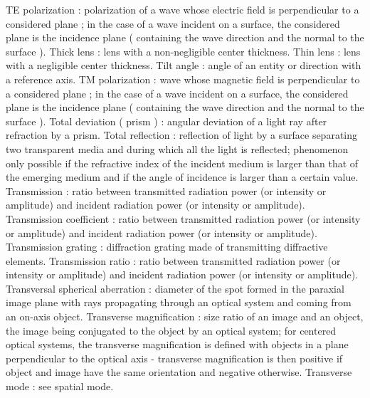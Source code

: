 TE polarization                                      : polarization of a wave whose electric field is perpendicular to a considered plane ; in the case of a wave incident on a surface, the considered plane is the incidence plane ( containing the wave direction and the normal to the surface ).
Thick lens                                           : lens with a non-negligible center thickness.
Thin lens                                            : lens with a negligible center thickness.
Tilt angle                                           : angle of an entity or direction with a reference axis.
TM polarization                                      : wave whose magnetic field is perpendicular to a considered plane ; in the case of a wave incident on a surface, the considered plane is the incidence plane ( containing the wave direction and the normal to the surface ).
Total deviation ( prism )                            : angular deviation of a light ray after refraction by a prism.
Total reflection                                     : reflection of light by a surface separating two transparent media and during which all the light is reflected; phenomenon only possible if the refractive index of the incident medium is larger than that of the emerging medium and if the angle of incidence is larger than a certain value.
Transmission                                         : ratio between transmitted radiation power (or intensity or amplitude) and incident radiation power (or intensity or amplitude).
Transmission coefficient                             : ratio between transmitted radiation power (or intensity or amplitude) and incident radiation power (or intensity or amplitude).
Transmission grating                                 : diffraction grating made of transmitting diffractive elements.
Transmission ratio                                   : ratio between transmitted radiation power (or intensity or amplitude) and incident radiation power (or intensity or amplitude).
Transversal spherical aberration                     : diameter of the spot formed in the paraxial image plane with rays propagating through an optical system and coming from an on-axis object.
Transverse magnification                             : size ratio of an image and an object, the image being conjugated to the object by an optical system; for centered optical systems, the transverse magnification is defined with objects in a plane perpendicular to the optical axis - transverse magnification is then positive if object and image have the same orientation and negative otherwise.
Transverse mode                                      : see spatial mode.
